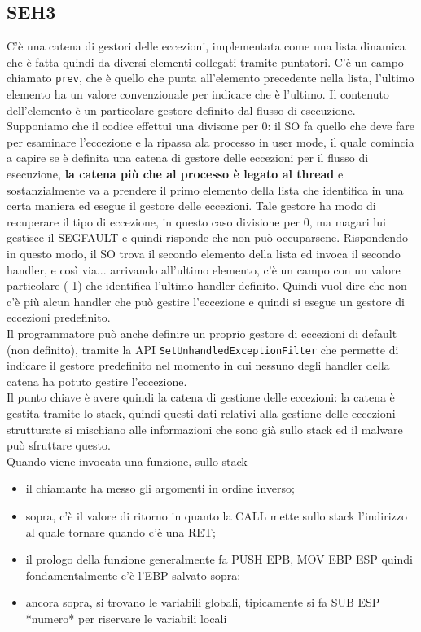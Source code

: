\documentclass[12pt, oneside]{extbook}
\begin{document}
\subsection{SEH3}
C'è una catena di gestori delle eccezioni, implementata come una lista dinamica che è fatta quindi da diversi elementi collegati tramite puntatori. C'è un campo chiamato \texttt{prev}, che è quello che punta all'elemento precedente nella lista, l'ultimo elemento ha un valore convenzionale per indicare che è l'ultimo. Il contenuto dell'elemento è un particolare gestore definito dal flusso di esecuzione. Supponiamo che il codice effettui una divisone per 0: il SO fa quello che deve fare per esaminare l'eccezione e la ripassa ala processo in user mode, il quale comincia a capire se è definita una catena di gestore delle eccezioni per il flusso di esecuzione, \textbf{la catena più che al processo è legato al thread} e sostanzialmente va a prendere il primo elemento della lista che identifica in una certa maniera ed esegue il gestore delle eccezioni. Tale gestore ha modo di recuperare il tipo di eccezione, in questo caso divisione per 0, ma magari lui gestisce il SEGFAULT e quindi risponde che non può occuparsene. Rispondendo in questo modo, il SO trova il secondo elemento della lista ed invoca il secondo handler, e così via... arrivando all'ultimo elemento, c'è un campo con un valore particolare (-1) che identifica l'ultimo handler definito. Quindi vuol dire che non c'è più alcun handler che può gestire l'eccezione e quindi si esegue un gestore di eccezioni predefinito.\\Il programmatore può anche definire un proprio gestore di eccezioni di default (non definito), tramite la API \texttt{SetUnhandledExceptionFilter} che permette di indicare il gestore predefinito nel momento in cui nessuno degli handler della catena ha potuto gestire l'eccezione.\\Il punto chiave è avere quindi la catena di gestione delle eccezioni: la catena è gestita tramite lo stack, quindi questi dati relativi alla gestione delle eccezioni strutturate si mischiano alle informazioni che sono già sullo stack ed il malware può sfruttare questo.\\Quando viene invocata una funzione, sullo stack 
\begin{itemize}
\item il chiamante ha messo gli argomenti in ordine inverso;
\item sopra, c'è il valore di ritorno in quanto la CALL mette sullo stack l'indirizzo al quale tornare quando c'è una RET;
\item il prologo della funzione generalmente fa PUSH EPB, MOV EBP ESP quindi fondamentalmente c'è l'EBP salvato sopra;
\item ancora sopra, si trovano le variabili globali, tipicamente si fa SUB ESP *numero* per riservare le variabili locali
\end{itemize}
\end{document}
